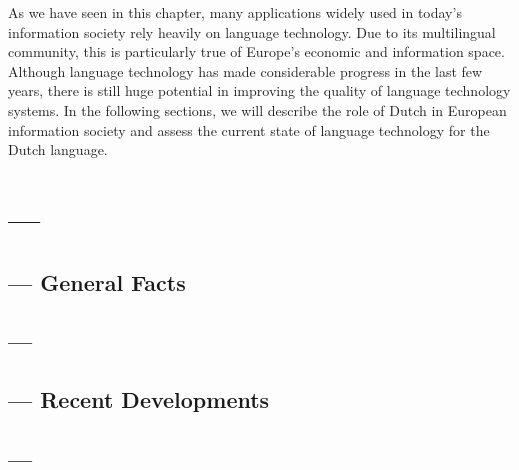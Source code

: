 \documentclass{scrartcl}
\begin{document}
\begin{Parallel}[c]{70mm}{70mm}
{    As we have seen in this chapter, many applications widely used in today's information society rely heavily on language technology. Due to its multilingual community, this is particularly true of Europe's economic and information space. Although language technology has made considerable progress in the last few years, there is still huge potential in improving the quality of language technology systems. In the following sections, we will describe the role of Dutch in European information society and assess the current state of language technology for the Dutch language.
  }

  \ParallelPar


  \section{ --- }


  \subsection{ --- General Facts}

  \MyParallelLText{
    
  }

  \MyParallelRText{


  }
  \ParallelPar



  \subsection{ ---  }

  \MyParallelLText{
    
  }

  \MyParallelRText{


  }

  \ParallelPar


  \subsection{ --- Recent Developments}

  \MyParallelLText{


  }

  \MyParallelRText{

  }

  \ParallelPar


  \subsection{ --- }


\end{Parallel}
\end{document}
